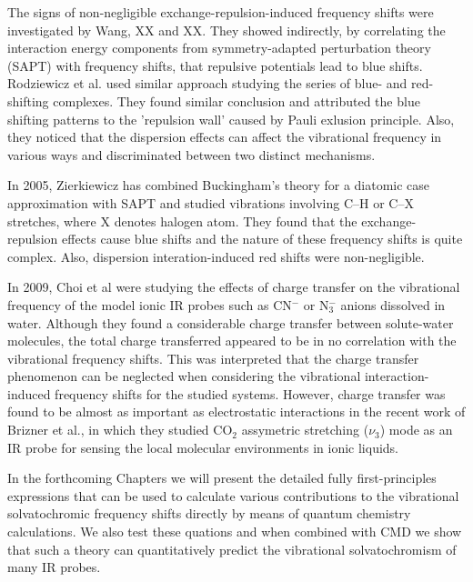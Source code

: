 \documentclass[a4paper,titlepage,twoside,fleqn,12pt]{book}
\begin{document}
\begin{refsection}
The signs of non-negligible exchange-repulsion-induced frequency shifts were 
investigated by Wang, XX and XX. They showed indirectly, by correlating the interaction
energy components from symmetry-adapted perturbation theory (SAPT) with frequency shifts, that repulsive potentials
lead to blue shifts. Rodziewicz et al. used similar approach studying the series of 
blue\hyp{} and red\hyp{}shifting complexes. They found similar conclusion and attributed the
blue shifting patterns to the 'repulsion wall' caused by Pauli exlusion principle. 
Also, they noticed that
the dispersion effects can affect the vibrational frequency in various ways
and discriminated between two distinct mechanisms.

In 2005, Zierkiewicz has combined Buckingham's theory for a diatomic case approximation with SAPT 
and studied vibrations involving C--H or C--X
stretches, where X denotes halogen atom. They found that the exchange-repulsion effects
cause blue shifts and the nature of these frequency shifts is quite complex. Also, dispersion
interation\hyp{}induced red shifts were non-negligible.

In 2009, Choi et al were studying the effects of charge transfer on the vibrational
frequency of the model ionic IR probes such as CN$^-$ or N$_3^-$ anions dissolved in water. 
Although they found a considerable charge
transfer between solute-water molecules, the total charge transferred appeared to be in no
correlation with the vibrational frequency shifts. This was interpreted that the charge transfer 
phenomenon can be neglected when considering the vibrational interaction-induced frequency shifts
for the studied systems. However, charge transfer was found to be almost as important as electrostatic
interactions in the recent work of Brizner et al., in which they studied CO$_2$ assymetric
stretching ($\nu_3$) mode as an IR probe for sensing the local molecular environments in ionic
liquids.

In the forthcoming Chapters we will present the detailed fully first-principles expressions
that can be used to calculate various contributions to the vibrational solvatochromic frequency
shifts directly by means of quantum chemistry calculations. We also test these quations 
and when combined with CMD we show that such a theory can quantitatively predict the
vibrational solvatochromism of many IR probes.

\printbibliography[heading=subbibintoc,title={References}]
\end{refsection}
\end{document}
